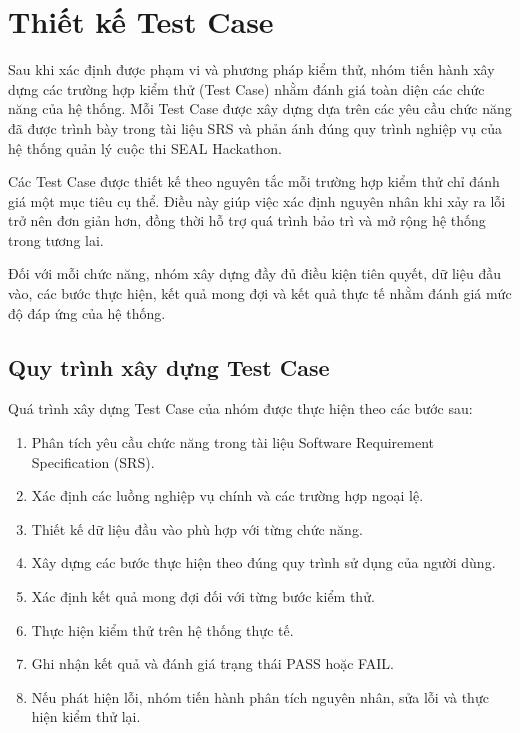 \section{Thiết kế Test Case}

Sau khi xác định được phạm vi và phương pháp kiểm thử, nhóm tiến hành xây dựng các trường hợp kiểm thử (Test Case) nhằm đánh giá toàn diện các chức năng của hệ thống. Mỗi Test Case được xây dựng dựa trên các yêu cầu chức năng đã được trình bày trong tài liệu SRS và phản ánh đúng quy trình nghiệp vụ của hệ thống quản lý cuộc thi SEAL Hackathon.

Các Test Case được thiết kế theo nguyên tắc mỗi trường hợp kiểm thử chỉ đánh giá một mục tiêu cụ thể. Điều này giúp việc xác định nguyên nhân khi xảy ra lỗi trở nên đơn giản hơn, đồng thời hỗ trợ quá trình bảo trì và mở rộng hệ thống trong tương lai.

Đối với mỗi chức năng, nhóm xây dựng đầy đủ điều kiện tiên quyết, dữ liệu đầu vào, các bước thực hiện, kết quả mong đợi và kết quả thực tế nhằm đánh giá mức độ đáp ứng của hệ thống.


\subsection{Quy trình xây dựng Test Case}

Quá trình xây dựng Test Case của nhóm được thực hiện theo các bước sau:

\begin{enumerate}
	\item Phân tích yêu cầu chức năng trong tài liệu Software Requirement Specification (SRS).
	
	\item Xác định các luồng nghiệp vụ chính và các trường hợp ngoại lệ.
	
	\item Thiết kế dữ liệu đầu vào phù hợp với từng chức năng.
	
	\item Xây dựng các bước thực hiện theo đúng quy trình sử dụng của người dùng.
	
	\item Xác định kết quả mong đợi đối với từng bước kiểm thử.
	
	\item Thực hiện kiểm thử trên hệ thống thực tế.
	
	\item Ghi nhận kết quả và đánh giá trạng thái PASS hoặc FAIL.
	
	\item Nếu phát hiện lỗi, nhóm tiến hành phân tích nguyên nhân, sửa lỗi và thực hiện kiểm thử lại.
\end{enumerate}

